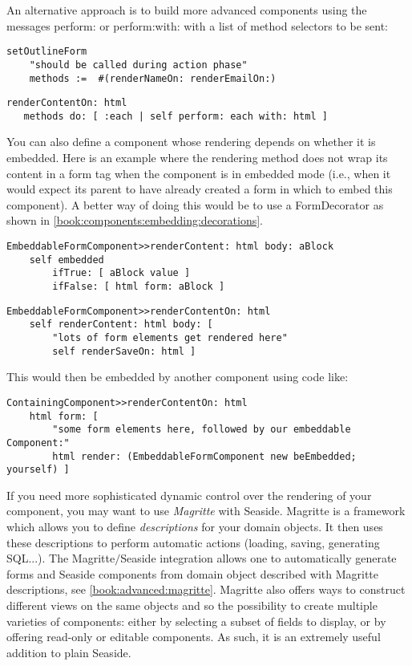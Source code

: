 \documentclass[a4paper,10pt,twoside]{book}
\newcommand{\ct}[1]{{\small\ttfamily\textup{#1}}}
\begin{document}
An alternative approach is to build more advanced components using the messages \ct{perform:} or \ct{perform:with:} with a list of method selectors to be sent:

\begin{lstlisting}
setOutlineForm
    "should be called during action phase"
    methods :=  #(renderNameOn: renderEmailOn:)
\end{lstlisting}

\begin{lstlisting}
renderContentOn: html
   methods do: [ :each | self perform: each with: html ] 
\end{lstlisting}

You can also define a component whose rendering depends on whether it is embedded. Here is an example where the rendering method does not wrap its content in a form tag when the component is in embedded mode (i.e., when it would expect its parent to have already created a form in which to embed this component).  A better way of doing this would be to use a \ct{FormDecorator} as shown in \autoref{book:components:embedding:decorations}.

\begin{lstlisting}
EmbeddableFormComponent>>renderContent: html body: aBlock
    self embedded
        ifTrue: [ aBlock value ]
        ifFalse: [ html form: aBlock ]
\end{lstlisting}

\begin{lstlisting}
EmbeddableFormComponent>>renderContentOn: html
    self renderContent: html body: [
        "lots of form elements get rendered here"
        self renderSaveOn: html ]
\end{lstlisting}

This would then be embedded by another component using code like:

\begin{lstlisting}
ContainingComponent>>renderContentOn: html
    html form: [
        "some form elements here, followed by our embeddable Component:"
        html render: (EmbeddableFormComponent new beEmbedded; yourself) ]
\end{lstlisting}

If you need more sophisticated dynamic control over the rendering of your component, you may want to use \textit{Magritte} with Seaside. Magritte is a framework which allows you to define \textit{descriptions} for your domain objects. It then uses these descriptions to perform automatic actions (loading, saving, generating SQL...). The Magritte$/$Seaside integration allows one to automatically  generate forms and Seaside components from domain object described with Magritte descriptions, see \autoref{book:advanced:magritte}. Magritte also offers ways to construct different views on the same objects and so the possibility to create multiple varieties of components: either by selecting a subset of fields to display, or by offering read-only or editable components. As such, it is an extremely useful addition to plain Seaside.
\end{document}
